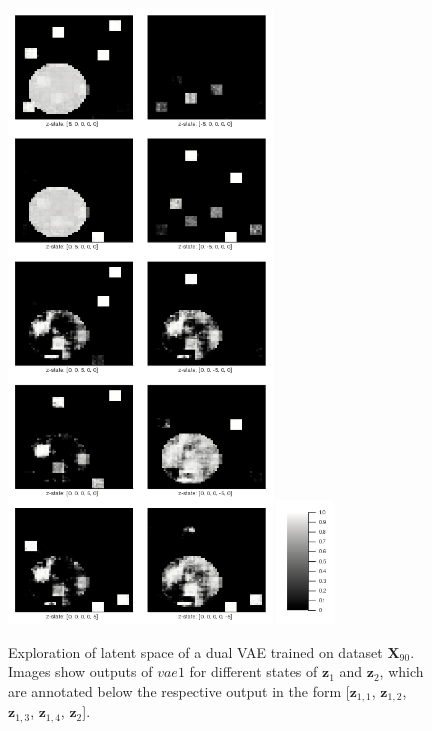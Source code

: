 \documentclass[12pt]{report}
\theoremstyle{definition}
\begin{document}
\begin{figure}
\begin{center}
  \includegraphics[width=7cm]{../code/plots/exploration1.png}
  \includegraphics[width=1.5cm]{../code/plots/scale.png}
  \caption{Exploration of latent space of a dual VAE trained on dataset $\mathbf{X}_{90}$. Images show outputs of $vae1$ for different states of $\mathbf{z}_1$ and $\mathbf{z}_2$, which are annotated below the respective output in the form [$\mathbf{z}_{1, 1}$, $\mathbf{z}_{1, 2}$, $\mathbf{z}_{1, 3}$, $\mathbf{z}_{1, 4}$, $\mathbf{z}_2$].}
  \label{fig:expl1}
\end{center}
\end{figure}
\end{document}
